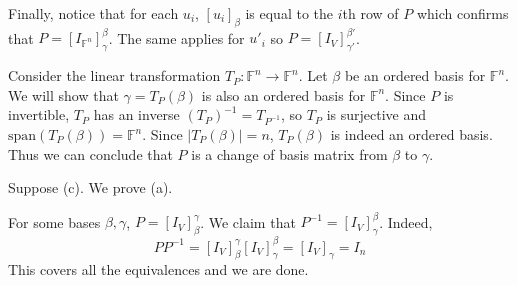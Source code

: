 \documentclass{eh-homework}
\begin{document}
\begin{question}{8}
        Finally, notice that for each \(u_i\), \([u_i]_\beta\) is equal to the \(i\)th row of \(P\) which confirms that \(P = [I_{\mathbb{F}^n}]_\gamma^\beta\). The same applies for \(u'_i\) so \(P = [I_V]_{\gamma'}^{\beta'}\).

        Consider the linear transformation \(T_P : \mathbb{F}^n \to \mathbb{F}^n\). Let \(\beta\) be an ordered basis for \(\mathbb{F}^n\). We will show that \(\gamma = T_P(\beta)\) is also an ordered basis for \(\mathbb{F}^n\). Since \(P\) is invertible, \(T_P\) has an inverse \((T_P)^{-1} = T_{P^{-1}}\), so \(T_P\) is surjective and \(\mathrm{span} (T_P(\beta)) = \mathbb{F}^n\). Since \(|T_P(\beta)| = n\), \(T_P(\beta)\) is indeed an ordered basis. Thus we can conclude that \(P\) is a change of basis matrix from \(\beta\) to \(\gamma\).

        \medskip

        Suppose (c). We prove (a).

        For some bases \(\beta , \gamma\), \(P = [I_V]_\beta^\gamma\). We claim that \(P^{-1} = [I_V]_\gamma^{\beta}\). Indeed,
        \[
            P P^{-1} =  [I_V]_\beta^\gamma [I_V]_\gamma^{\beta} = [I_V]_\gamma = I_n
        \]
        This covers all the equivalences and we are done.
    \end{question}
    \newpage
\end{document}
